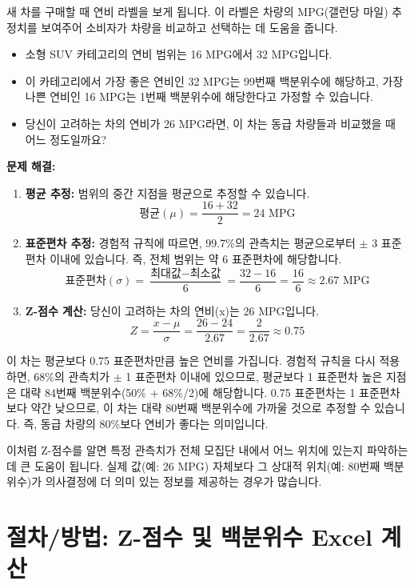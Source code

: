 \documentclass[11pt,a4paper]{article}
\theoremstyle{definition}
\begin{document}
\begin{examplebox}[title=자동차 연비 비교]
새 차를 구매할 때 연비 라벨을 보게 됩니다. 이 라벨은 차량의 MPG(갤런당 마일) 추정치를 보여주어 소비자가 차량을 비교하고 선택하는 데 도움을 줍니다.
\begin{itemize}
    \item 소형 SUV 카테고리의 연비 범위는 16 MPG에서 32 MPG입니다.
    \item 이 카테고리에서 가장 좋은 연비인 32 MPG는 99번째 백분위수에 해당하고, 가장 나쁜 연비인 16 MPG는 1번째 백분위수에 해당한다고 가정할 수 있습니다.
    \item 당신이 고려하는 차의 연비가 26 MPG라면, 이 차는 동급 차량들과 비교했을 때 어느 정도일까요?
\end{itemize}

\textbf{문제 해결:}
\begin{enumerate}
    \item \textbf{평균 추정:} 범위의 중간 지점을 평균으로 추정할 수 있습니다.
    \[ \text{평균} (\mu) = \frac{16 + 32}{2} = 24 \text{ MPG} \]
    \item \textbf{표준편차 추정:} 경험적 규칙에 따르면, 99.7\%의 관측치는 평균으로부터 \(\pm\) 3 표준편차 이내에 있습니다. 즉, 전체 범위는 약 6 표준편차에 해당합니다.
    \[ \text{표준편차} (\sigma) = \frac{\text{최대값} - \text{최소값}}{6} = \frac{32 - 16}{6} = \frac{16}{6} \approx 2.67 \text{ MPG} \]
    \item \textbf{Z-점수 계산:} 당신이 고려하는 차의 연비(x)는 26 MPG입니다.
    \[ Z = \frac{x - \mu}{\sigma} = \frac{26 - 24}{2.67} = \frac{2}{2.67} \approx 0.75 \]
\end{enumerate}
이 차는 평균보다 0.75 표준편차만큼 높은 연비를 가집니다. 경험적 규칙을 다시 적용하면, 68\%의 관측치가 \(\pm\) 1 표준편차 이내에 있으므로, 평균보다 1 표준편차 높은 지점은 대략 84번째 백분위수(50\% + 68\%/2)에 해당합니다. 0.75 표준편차는 1 표준편차보다 약간 낮으므로, 이 차는 대략 80번째 백분위수에 가까울 것으로 추정할 수 있습니다. 즉, 동급 차량의 80\%보다 연비가 좋다는 의미입니다.

이처럼 Z-점수를 알면 특정 관측치가 전체 모집단 내에서 어느 위치에 있는지 파악하는 데 큰 도움이 됩니다. 실제 값(예: 26 MPG) 자체보다 그 상대적 위치(예: 80번째 백분위수)가 의사결정에 더 의미 있는 정보를 제공하는 경우가 많습니다.
\end{examplebox}

\newpage
\section{절차/방법: Z-점수 및 백분위수 Excel 계산}
\end{document}
